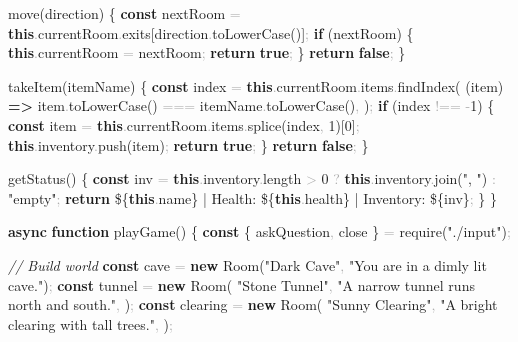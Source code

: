 \documentclass[
  justified,
  openright,
]{tufte-book}
\newcommand{\KeywordTok}[1]{\textcolor{CodeKeyword}{\textbf{#1}}}  %
\newcommand{\StringTok}[1]{\textcolor{CodeString}{#1}}              %
\newcommand{\CommentTok}[1]{\textcolor{CodeComment}{\textit{#1}}}  %
\newcommand{\CodeNumTok}[1]{\textcolor{CodeNumber}{#1}}             %
\newcommand{\CodeFuncTok}[1]{\textcolor{CodeKeyword}{#1}}           %
\newcommand{\CodeTypeTok}[1]{\textcolor{CodeType}{#1}}              %
\newcommand{\CodeAccentTok}[1]{\textcolor{CodeAccent}{#1}}          %
\newcommand{\OperatorTok}[1]{\textcolor{DarkGray}{#1}}              %
\newenvironment{Shaded}{%
  \begin{mdframed}[style=TufteCode]%
}{%
  \end{mdframed}%
}
\begin{document}
\begin{Shaded}
\begin{Highlighting}[]
  \CodeFuncTok{move}(direction) \{
    \KeywordTok{const} nextRoom \OperatorTok{=} \KeywordTok{this}\OperatorTok{.}\CodeTypeTok{currentRoom}\OperatorTok{.}\CodeTypeTok{exits}[direction\OperatorTok{.}\CodeFuncTok{toLowerCase}()]\OperatorTok{;}
    \KeywordTok{if} (nextRoom) \{
      \KeywordTok{this}\OperatorTok{.}\CodeTypeTok{currentRoom} \OperatorTok{=} nextRoom\OperatorTok{;}
      \KeywordTok{return} \KeywordTok{true}\OperatorTok{;}
    \}
    \KeywordTok{return} \KeywordTok{false}\OperatorTok{;}
  \}
 
  \CodeFuncTok{takeItem}(itemName) \{
    \KeywordTok{const} index \OperatorTok{=} \KeywordTok{this}\OperatorTok{.}\CodeTypeTok{currentRoom}\OperatorTok{.}\CodeTypeTok{items}\OperatorTok{.}\CodeFuncTok{findIndex}(
      (item) \KeywordTok{=\textgreater{}} item\OperatorTok{.}\CodeFuncTok{toLowerCase}() \OperatorTok{===} itemName\OperatorTok{.}\CodeFuncTok{toLowerCase}()\OperatorTok{,}
    )\OperatorTok{;}
    \KeywordTok{if} (index \OperatorTok{!==} \OperatorTok{{-}}\CodeNumTok{1}) \{
      \KeywordTok{const} item \OperatorTok{=} \KeywordTok{this}\OperatorTok{.}\CodeTypeTok{currentRoom}\OperatorTok{.}\CodeTypeTok{items}\OperatorTok{.}\CodeFuncTok{splice}(index\OperatorTok{,} \CodeNumTok{1})[\CodeNumTok{0}]\OperatorTok{;}
      \KeywordTok{this}\OperatorTok{.}\CodeTypeTok{inventory}\OperatorTok{.}\CodeFuncTok{push}(item)\OperatorTok{;}
      \KeywordTok{return} \KeywordTok{true}\OperatorTok{;}
    \}
    \KeywordTok{return} \KeywordTok{false}\OperatorTok{;}
  \}
 
  \CodeFuncTok{getStatus}() \{
    \KeywordTok{const} inv \OperatorTok{=} \KeywordTok{this}\OperatorTok{.}\CodeTypeTok{inventory}\OperatorTok{.}\CodeTypeTok{length} \OperatorTok{\textgreater{}} \CodeNumTok{0} \OperatorTok{?} \KeywordTok{this}\OperatorTok{.}\CodeTypeTok{inventory}\OperatorTok{.}\CodeFuncTok{join}(\StringTok{", "}) \OperatorTok{:} \StringTok{"empty"}\OperatorTok{;}
    \KeywordTok{return} \StringTok{\textasciigrave{}}\StringTok{\$\{}\KeywordTok{this}\OperatorTok{.}\CodeTypeTok{name}\StringTok{\}}\StringTok{ | Health: }\StringTok{\$\{}\KeywordTok{this}\OperatorTok{.}\CodeTypeTok{health}\StringTok{\}}\StringTok{ | Inventory: }\StringTok{\$\{}inv\StringTok{\}}\StringTok{\textasciigrave{}}\OperatorTok{;}
  \}
\}
 
\KeywordTok{async} \KeywordTok{function} \CodeFuncTok{playGame}() \{
  \KeywordTok{const} \{ askQuestion\OperatorTok{,} close \} \OperatorTok{=} \CodeAccentTok{require}(\StringTok{"./input"})\OperatorTok{;}
 
  \CommentTok{// Build world}
  \KeywordTok{const} cave \OperatorTok{=} \KeywordTok{new} \CodeFuncTok{Room}(\StringTok{"Dark Cave"}\OperatorTok{,} \StringTok{"You are in a dimly lit cave."})\OperatorTok{;}
  \KeywordTok{const} tunnel \OperatorTok{=} \KeywordTok{new} \CodeFuncTok{Room}(
    \StringTok{"Stone Tunnel"}\OperatorTok{,}
    \StringTok{"A narrow tunnel runs north and south."}\OperatorTok{,}
  )\OperatorTok{;}
  \KeywordTok{const} clearing \OperatorTok{=} \KeywordTok{new} \CodeFuncTok{Room}(
    \StringTok{"Sunny Clearing"}\OperatorTok{,}
    \StringTok{"A bright clearing with tall trees."}\OperatorTok{,}
  )\OperatorTok{;}
 

\end{Highlighting}
\end{Shaded}
\end{document}
